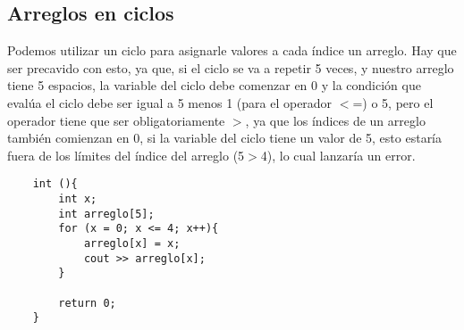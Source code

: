 \subsection{Arreglos en ciclos}
Podemos utilizar un ciclo para asignarle valores a cada índice un arreglo. Hay que ser precavido con esto, ya que, si el ciclo se va a repetir 5 veces, y nuestro arreglo tiene 5 espacios, la variable del ciclo debe comenzar en 0 y la condición que evalúa el ciclo debe ser igual a 5 menos 1 (para el operador $<$=) o 5, pero el operador tiene que ser obligatoriamente $>$, ya que los índices de un arreglo también comienzan en 0, si la variable del ciclo tiene un valor de 5, esto estaría fuera de los límites del índice del arreglo (5$>$4), lo cual lanzaría un error.
\begin{lstlisting}
    int (){
        int x;
        int arreglo[5];
        for (x = 0; x <= 4; x++){
            arreglo[x] = x;
            cout >> arreglo[x];
        }
        
        return 0;
    }
\end{lstlisting}

